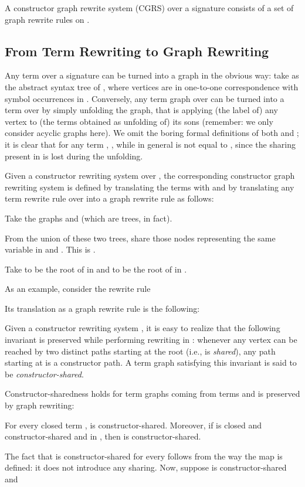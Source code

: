 \documentclass{LMCS}
\newenvironment{varitemize}
{
\begin{list}{\labelitemi}
{\setlength{\itemsep}{0.0mm}
 \setlength{\topsep}{0.0mm}
 \setlength{\parindent}{0.0mm}
 \setlength{\parskip}{0.0mm}
 \setlength{\parsep}{0.0mm}
 \setlength{\partopsep}{0.0mm}
 \setlength{\leftmargin}{15pt}
 \setlength{\labelsep}{5pt}
 \setlength{\labelwidth}{10pt}}}
{
 \end{list} 
}
\begin{document}
\begin{defi}
A constructor graph rewrite system (CGRS) over a signature  consists of
a set  of graph rewrite rules  on .
\end{defi}
\subsection{From Term Rewriting to Graph Rewriting}\label{Sect-TRtoGR}
Any term  over a signature  can be turned into a
graph  in the obvious way: take as  the abstract
syntax tree of , where vertices are in one-to-one correspondence
with symbol occurrences in . Conversely, any term graph
 over  can be turned into a term 
over  by simply unfolding the graph, that is applying (the label of) any vertex
to (the terms obtained as unfolding of) its sons (remember: we only consider acyclic graphs here).
We omit the boring formal definitions of both  and ; it is clear that 
for any term , , while in general 
 is not equal to , since the sharing present in  is lost during the unfolding. 

\begin{defi}
Given a constructor rewriting system  over , the 
corresponding constructor graph rewriting system  is defined 
by translating the terms with  and by translating any term 
rewrite rule  
over  into a graph rewrite rule 
as follows:
\begin{varitemize}
\item
  Take the graphs  and  (which are
  trees, in fact). 
\item
  From the union of these two trees, share those
  nodes representing the same variable in  and .
  This is .
\item
  Take  to be the root of  in  and
   to be the root of  in .
\end{varitemize}
\end{defi}

As an example, consider the rewrite rule

Its translation as a graph rewrite rule is the following:


Given a constructor rewriting system , it is easy to realize that
the following invariant is preserved while performing
rewriting in : whenever any vertex  can
be reached by two distinct paths starting at the root
(i.e.,  is \emph{shared}), any path starting at
 is a constructor path. A term graph
satisfying this invariant is said to be 
\emph{constructor-shared}.

Constructor-sharedness holds for term graphs coming from terms and
is preserved by graph rewriting:
\begin{lem}\label{lemma:constructorsharedness}
For every closed term ,  is constructor-shared.
Moreover, if  is closed and constructor-shared and  in , 
then  is constructor-shared.
\end{lem}
\proof
The fact that  is constructor-shared for every  follows
from the way the  map is defined: it does not introduce any
sharing. Now, suppose  is constructor-shared and
\end{document}
